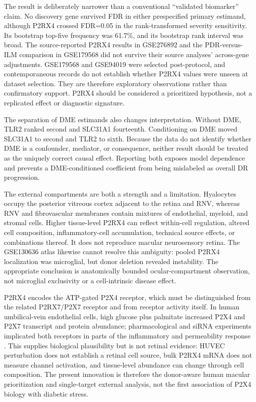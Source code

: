 \documentclass[12pt]{article}
\begin{document}
The result is deliberately narrower than a conventional ``validated biomarker'' claim. No discovery gene survived FDR in either prespecified primary estimand, although P2RX4 crossed FDR=0.05 in the rank-transformed severity sensitivity. Its bootstrap top-five frequency was 61.7\%, and its bootstrap rank interval was broad. The source-reported P2RX4 results in GSE276892 and the PDR-versus-ILM comparison in GSE179568 did not survive their source analyses' across-gene adjustments. GSE179568 and GSE94019 were selected post-protocol, and contemporaneous records do not establish whether P2RX4 values were unseen at dataset selection. They are therefore exploratory observations rather than confirmatory support. P2RX4 should be considered a prioritized hypothesis, not a replicated effect or diagnostic signature.

The separation of DME estimands also changes interpretation. Without DME, TLR2 ranked second and SLC31A1 fourteenth. Conditioning on DME moved SLC31A1 to second and TLR2 to sixth. Because the data do not identify whether DME is a confounder, mediator, or consequence, neither result should be treated as the uniquely correct causal effect. Reporting both exposes model dependence and prevents a DME-conditioned coefficient from being mislabeled as overall DR progression.

The external compartments are both a strength and a limitation. Hyalocytes occupy the posterior vitreous cortex adjacent to the retina and RNV, whereas RNV and fibrovascular membranes contain mixtures of endothelial, myeloid, and stromal cells. Higher tissue-level P2RX4 can reflect within-cell regulation, altered cell composition, inflammatory-cell accumulation, technical source effects, or combinations thereof. It does not reproduce macular neurosensory retina. The GSE130636 atlas likewise cannot resolve this ambiguity: pooled P2RX4 localization was microglial, but donor deletion revealed instability. The appropriate conclusion is anatomically bounded ocular-compartment observation, not microglial exclusivity or a cell-intrinsic disease effect.

P2RX4 encodes the ATP-gated P2X4 receptor, which must be distinguished from the related P2RX7/P2X7 receptor and from receptor activity itself. In human umbilical-vein endothelial cells, high glucose plus palmitate increased P2X4 and P2X7 transcript and protein abundance; pharmacological and siRNA experiments implicated both receptors in parts of the inflammatory and permeability response \citep{Sathanoori2015}. This supplies biological plausibility but is not retinal evidence: HUVEC perturbation does not establish a retinal cell source, bulk P2RX4 mRNA does not measure channel activation, and tissue-level abundance can change through cell composition. The present innovation is therefore the donor-aware human macular prioritization and single-target external analysis, not the first association of P2X4 biology with diabetic stress.
\end{document}
